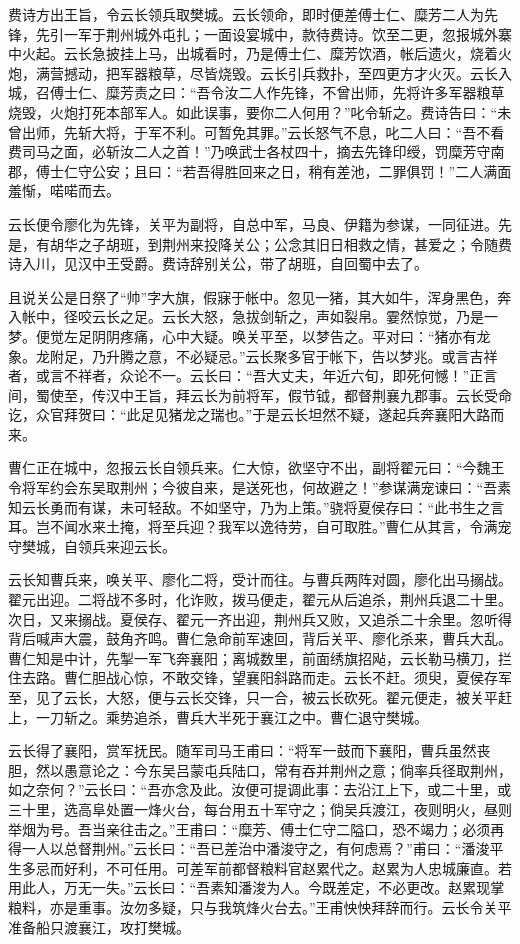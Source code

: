 费诗方出王旨，令云长领兵取樊城。云长领命，即时便差傅士仁、糜芳二人为先锋，先引一军于荆州城外屯扎；一面设宴城中，款待费诗。饮至二更，忽报城外寨中火起。云长急披挂上马，出城看时，乃是傅士仁、糜芳饮酒，帐后遗火，烧着火炮，满营撼动，把军器粮草，尽皆烧毁。云长引兵救扑，至四更方才火灭。云长入城，召傅士仁、糜芳责之曰：“吾令汝二人作先锋，不曾出师，先将许多军器粮草烧毁，火炮打死本部军人。如此误事，要你二人何用？”叱令斩之。费诗告曰：“未曾出师，先斩大将，于军不利。可暂免其罪。”云长怒气不息，叱二人曰：“吾不看费司马之面，必斩汝二人之首！”乃唤武士各杖四十，摘去先锋印绶，罚糜芳守南郡，傅士仁守公安；且曰：“若吾得胜回来之日，稍有差池，二罪俱罚！”二人满面羞惭，喏喏而去。

云长便令廖化为先锋，关平为副将，自总中军，马良、伊籍为参谋，一同征进。先是，有胡华之子胡班，到荆州来投降关公；公念其旧日相救之情，甚爱之；令随费诗入川，见汉中王受爵。费诗辞别关公，带了胡班，自回蜀中去了。

且说关公是日祭了“帅”字大旗，假寐于帐中。忽见一猪，其大如牛，浑身黑色，奔入帐中，径咬云长之足。云长大怒，急拔剑斩之，声如裂帛。霎然惊觉，乃是一梦。便觉左足阴阴疼痛，心中大疑。唤关平至，以梦告之。平对曰：“猪亦有龙象。龙附足，乃升腾之意，不必疑忌。”云长聚多官于帐下，告以梦兆。或言吉祥者，或言不祥者，众论不一。云长曰：“吾大丈夫，年近六旬，即死何憾！”正言间，蜀使至，传汉中王旨，拜云长为前将军，假节钺，都督荆襄九郡事。云长受命讫，众官拜贺曰：“此足见猪龙之瑞也。”于是云长坦然不疑，遂起兵奔襄阳大路而来。

曹仁正在城中，忽报云长自领兵来。仁大惊，欲坚守不出，副将翟元曰：“今魏王令将军约会东吴取荆州；今彼自来，是送死也，何故避之！”参谋满宠谏曰：“吾素知云长勇而有谋，未可轻敌。不如坚守，乃为上策。”骁将夏侯存曰：“此书生之言耳。岂不闻水来土掩，将至兵迎？我军以逸待劳，自可取胜。”曹仁从其言，令满宠守樊城，自领兵来迎云长。

云长知曹兵来，唤关平、廖化二将，受计而往。与曹兵两阵对圆，廖化出马搦战。翟元出迎。二将战不多时，化诈败，拨马便走，翟元从后追杀，荆州兵退二十里。次日，又来搦战。夏侯存、翟元一齐出迎，荆州兵又败，又追杀二十余里。忽听得背后喊声大震，鼓角齐鸣。曹仁急命前军速回，背后关平、廖化杀来，曹兵大乱。曹仁知是中计，先掣一军飞奔襄阳；离城数里，前面绣旗招飐，云长勒马横刀，拦住去路。曹仁胆战心惊，不敢交锋，望襄阳斜路而走。云长不赶。须臾，夏侯存军至，见了云长，大怒，便与云长交锋，只一合，被云长砍死。翟元便走，被关平赶上，一刀斩之。乘势追杀，曹兵大半死于襄江之中。曹仁退守樊城。

云长得了襄阳，赏军抚民。随军司马王甫曰：“将军一鼓而下襄阳，曹兵虽然丧胆，然以愚意论之：今东吴吕蒙屯兵陆口，常有吞并荆州之意；倘率兵径取荆州，如之奈何？”云长曰：“吾亦念及此。汝便可提调此事：去沿江上下，或二十里，或三十里，选高阜处置一烽火台，每台用五十军守之；倘吴兵渡江，夜则明火，昼则举烟为号。吾当亲往击之。”王甫曰：“糜芳、傅士仁守二隘口，恐不竭力；必须再得一人以总督荆州。”云长曰：“吾已差治中潘浚守之，有何虑焉？”甫曰：“潘浚平生多忌而好利，不可任用。可差军前都督粮料官赵累代之。赵累为人忠城廉直。若用此人，万无一失。”云长曰：“吾素知潘浚为人。今既差定，不必更改。赵累现掌粮料，亦是重事。汝勿多疑，只与我筑烽火台去。”王甫怏怏拜辞而行。云长令关平准备船只渡襄江，攻打樊城。


